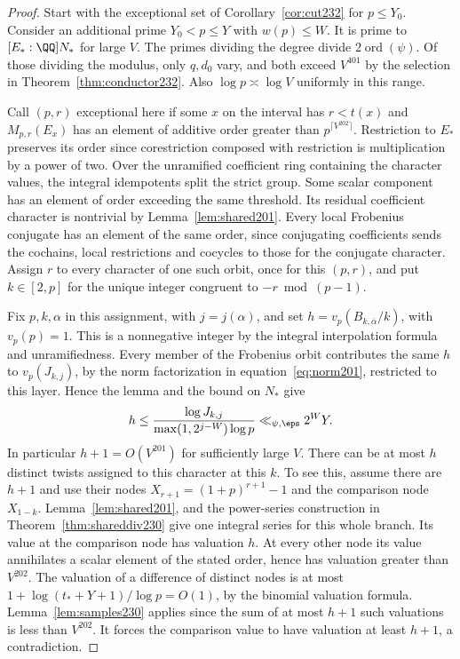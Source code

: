\documentclass[a4paper,11pt]{article}
\theoremstyle{definition}
\theoremstyle{remark}
\numberwithin{equation}{section}
\begin{document}
\begin{proof}
Start with the exceptional set of Corollary~\ref{cor:cut232} for
\(p\le Y_0\). Consider an additional prime \(Y_0<p\le Y\) with
\(w(p)\le W\). It is prime to \([E_*:\QQ]N_*\) for large \(V\).
The primes dividing the degree divide \(2\operatorname{ord}(\psi)\).
Of those dividing the modulus, only \(q,d_0\) vary, and both exceed
\(V^{401}\) by the selection in Theorem~\ref{thm:conductor232}.
Also \(\log p\asymp\log V\) uniformly in this range.

Call \((p,r)\) exceptional here if some \(x\) on the interval has
\(r<t(x)\) and \(M_{p,r}(E_x)\) has an element of additive order
greater than \(p^{\lceil V^{202}\rceil}\). Restriction to \(E_*\)
preserves its order since corestriction composed with restriction is
multiplication by a power of two. Over the unramified coefficient ring
containing the character values, the integral idempotents split the
strict group. Some scalar component has an element of order exceeding
the same threshold. Its residual coefficient character is nontrivial
by Lemma~\ref{lem:shared201}. Every local Frobenius
conjugate has an element of the same order, since conjugating
coefficients sends the cochains, local restrictions and cocycles to
those for the conjugate character. Assign \(r\) to every character of
one such orbit, once for this \((p,r)\), and put \(k\in[2,p]\) for
the unique integer congruent to \(-r\bmod(p-1)\).

Fix \(p,k,\alpha\) in this assignment, with \(j=j(\alpha)\), and set
\(h=v_p(B_{k,\bar\alpha}/k)\), with \(v_p(p)=1\). This is a
nonnegative integer by the integral interpolation formula and
unramifiedness. Every member of the Frobenius orbit contributes the
same \(h\) to \(v_p(J_{k,j})\), by the norm factorization in equation~\eqref{eq:norm201}, restricted to this layer. Hence the lemma
and the bound on \(N_*\) give
\[
  h\le\frac{\log J_{k,j}}{\max(1,2^{j-W})\log p}
    \ll_{\psi,\eps} 2^W Y.
\]
In particular \(h+1=O(V^{201})\) for sufficiently large \(V\).
There can be at most \(h\) distinct twists assigned to this character
at this \(k\). To see this, assume there are \(h+1\) and use their
nodes \(X_{r+1}=(1+p)^{r+1}-1\) and the comparison node \(X_{1-k}\).
Lemma~\ref{lem:shared201}, and the power-series construction
in Theorem~\ref{thm:shareddiv230} give one integral series for this
whole branch. Its value at the comparison node has valuation \(h\).
At every other node its value annihilates a scalar element of the
stated order, hence has valuation greater than \(V^{202}\). The
valuation of a difference of distinct nodes is at most
\(1+\log(t_*+Y+1)/\log p=O(1)\), by the binomial valuation formula.
Lemma~\ref{lem:samples230} applies since the sum of at most \(h+1\)
such valuations is less than \(V^{202}\). It forces the comparison
value to have valuation at least \(h+1\), a contradiction.


\end{proof}
\end{document}
